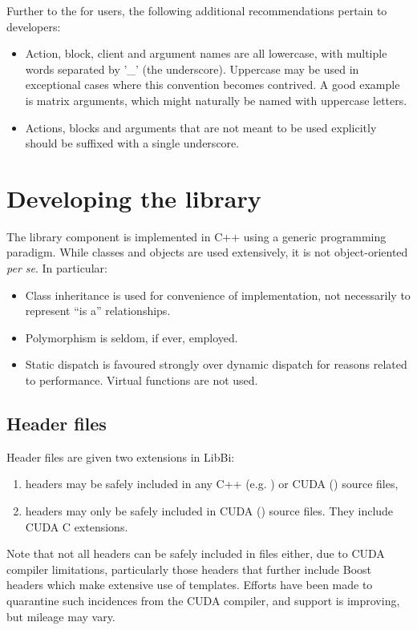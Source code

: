 Further to the  for users, the
following additional recommendations pertain to developers:
\begin{itemize}
\item Action, block, client and argument names are all lowercase, with
  multiple words separated by '\_' (the underscore). Uppercase may be used in
  exceptional cases where this convention becomes contrived. A good example is
  matrix arguments, which might naturally be named with uppercase letters.
\item Actions, blocks and arguments that are not meant to be used explicitly
  should be suffixed with a single underscore.
\end{itemize}

\section{Developing the library}

The library component is implemented in C++ using a generic programming
paradigm. While classes and objects are used extensively, it is not
object-oriented \textsl{per se}. In particular:
\begin{itemize}
\item Class inheritance is used for convenience of implementation, not
  necessarily to represent ``is a'' relationships.
\item Polymorphism is seldom, if ever, employed.
\item Static dispatch is favoured strongly over dynamic dispatch for
  reasons related to performance. Virtual functions are not used.
\end{itemize}

\subsection{Header files}

Header files are given two extensions in LibBi:
\begin{enumerate}
\item {} headers may be safely included in any C++ (e.g.
) or CUDA () source files,
\item {} headers may only be safely included in CUDA ()
source files. They include CUDA C extensions.
\end{enumerate}

Note that not all  headers can be safely included in 
files either, due to CUDA compiler limitations, particularly those headers
that further include Boost headers which make extensive use of
templates. Efforts have been made to quarantine such incidences from the CUDA
compiler, and support is improving, but mileage may vary.

